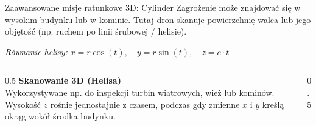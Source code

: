 \begin{frame}{Zaawansowane misje ratunkowe 3D: Cylinder}
    Zagrożenie może znajdować się w wysokim budynku lub w kominie. Tutaj dron skanuje powierzchnię walca lub jego objętość (np. ruchem po linii śrubowej / helisie).
    
    \vspace{0.3cm}
    \textit{Równanie helisy:} $x = r \cos(t), \quad y = r \sin(t), \quad z = c \cdot t$
    
    \begin{columns}
        \begin{column}{0.5\textwidth}
            \small
            \textbf{Skanowanie 3D (Helisa)} \\
            Wykorzystywane np. do inspekcji turbin wiatrowych, wież lub kominów. 
            Wysokość $z$ rośnie jednostajnie z czasem, podczas gdy zmienne $x$ i $y$ kreślą okrąg wokół środka budynku.
        \end{column}
        \begin{column}{0.5\textwidth}
            \begin{center}
            \end{center}
        \end{column}
    \end{columns}
\end{frame}

